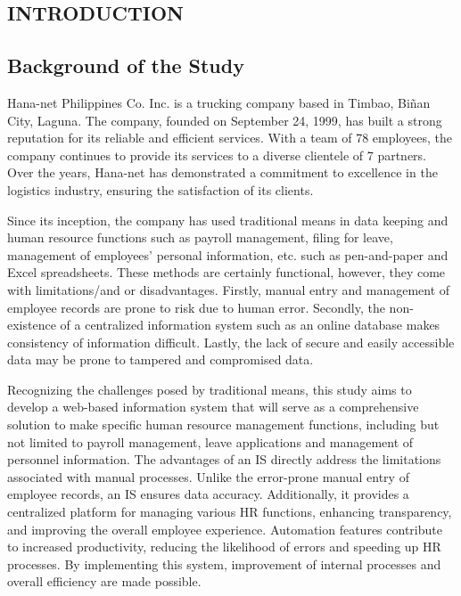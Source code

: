 \documentclass{icsthesis}
\begin{document}
	\begin{mainmatter}
		\section{INTRODUCTION}
			\subsection{\textbf{Background of the Study}}
Hana-net Philippines Co. Inc. is a trucking company based in Timbao, Biñan City, Laguna. The company, founded on September 24, 1999, has built a strong reputation for its reliable and efficient services. With a team of 78 employees, the company continues to provide its services to a diverse clientele of 7 partners. Over the years, Hana-net has demonstrated a commitment to excellence in the logistics industry, ensuring the satisfaction of its clients.

	Since its inception, the company has used traditional means in data keeping and human resource functions such as payroll management, filing for leave, management of employees’ personal information, etc. such as pen-and-paper and Excel spreadsheets. These methods are certainly functional, however, they come with limitations/and or disadvantages. Firstly, manual entry and management of employee records are prone to risk due to human error. Secondly, the non-existence of a centralized information system such as an online database makes consistency of information difficult. Lastly, the lack of secure and easily accessible data may be prone to tampered and compromised data. 

Recognizing the challenges posed by traditional means, this study aims to develop a web-based information system that will serve as a comprehensive solution to make specific human resource management functions, including but not limited to payroll management, leave applications and management of personnel information. The advantages of an IS directly address the limitations associated with manual processes. Unlike the error-prone manual entry of employee records, an IS ensures data accuracy. Additionally, it provides a centralized platform for managing various HR functions, enhancing transparency, and improving the overall employee experience. Automation features contribute to increased productivity, reducing the likelihood of errors and speeding up HR processes. By implementing this system, improvement of internal processes and overall efficiency are made possible.



\end{mainmatter}
\end{document}
